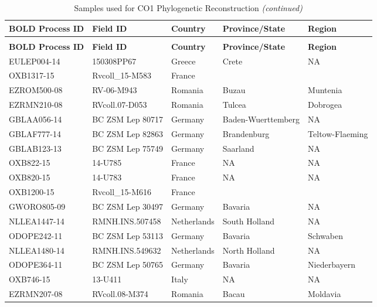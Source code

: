\documentclass[12pt,]{article}
\title{}
\author{}
\date{}
\begin{document}
\renewcommand{\thetable}{S\arabic{table}}
\renewcommand{\thefigure}{S\arabic{figure}}


\begin{landscape}\begingroup\fontsize{7}{9}\selectfont

\begin{longtable}{l|l|l|l|l}
\caption{\label{tab:Table S1}Samples used for CO1 Phylogenetic Reconstruction}\\
\hline
\textbf{BOLD Process ID} & \textbf{Field ID} & \textbf{Country} & \textbf{Province/State} & \textbf{Region}\\
\hline
\endfirsthead
\caption[]{Samples used for CO1 Phylogenetic Reconstruction \textit{(continued)}}\\
\hline
\textbf{BOLD Process ID} & \textbf{Field ID} & \textbf{Country} & \textbf{Province/State} & \textbf{Region}\\
\hline
\endhead
EULEP004-14 & 150308PP67 & Greece & Crete & NA\\
\hline
OXB1317-15 & Rvcoll\_15-M583 & France &  & \\
\hline
EZROM500-08 & RV-06-M943 & Romania & Buzau & Muntenia\\
\hline
EZRMN210-08 & RVcoll.07-D053 & Romania & Tulcea & Dobrogea\\
\hline
GBLAA056-14 & BC ZSM Lep 80717 & Germany & Baden-Wuerttemberg & NA\\
\hline
GBLAF777-14 & BC ZSM Lep 82863 & Germany & Brandenburg & Teltow-Flaeming\\
\hline
GBLAB123-13 & BC ZSM Lep 75749 & Germany & Saarland & NA\\
\hline
OXB822-15 & 14-U785 & France & NA & NA\\
\hline
OXB820-15 & 14-U783 & France & NA & NA\\
\hline
OXB1200-15 & Rvcoll\_15-M616 & France &  & \\
\hline
GWORO805-09 & BC ZSM Lep 30497 & Germany & Bavaria & NA\\
\hline
NLLEA1447-14 & RMNH.INS.507458 & Netherlands & South Holland & NA\\
\hline
ODOPE242-11 & BC ZSM Lep 53113 & Germany & Bavaria & Schwaben\\
\hline
NLLEA1480-14 & RMNH.INS.549632 & Netherlands & North Holland & NA\\
\hline
ODOPE364-11 & BC ZSM Lep 50765 & Germany & Bavaria & Niederbayern\\
\hline
OXB746-15 & 13-U411 & Italy & NA & NA\\
\hline
EZRMN207-08 & RVcoll.08-M374 & Romania & Bacau & Moldavia\\

\end{longtable}
\end{landscape}
\end{document}
